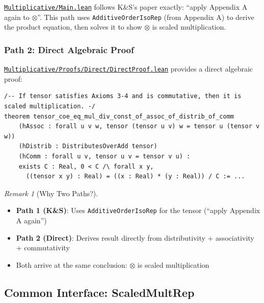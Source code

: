 \documentclass[11pt]{article}
\theoremstyle{definition}
\theoremstyle{remark}
\newtheorem{remark}[theorem]{Remark}
\begin{document}
\href{https://github.com/zariuq/ks-foundations-of-inference/blob/main/KnuthSkilling/Multiplicative/Main.lean}{\texttt{Multiplicative/Main.lean}} follows K\&S's paper exactly: ``apply Appendix A again to $\otimes$''.
This path uses \texttt{AdditiveOrderIsoRep} (from Appendix A) to derive the product equation,
then solves it to show $\otimes$ is scaled multiplication.

\subsubsection{Path 2: Direct Algebraic Proof}

\href{https://github.com/zariuq/ks-foundations-of-inference/blob/main/KnuthSkilling/Multiplicative/Proofs/Direct/DirectProof.lean}{\texttt{Multiplicative/Proofs/Direct/DirectProof.lean}} provides a direct algebraic proof:

\begin{lstlisting}[caption={Direct proof: Axioms 3--4 + commutativity $\Rightarrow$ scaled multiplication (\href{https://github.com/zariuq/ks-foundations-of-inference/blob/main/KnuthSkilling/Multiplicative/Proofs/Direct/DirectProof.lean\#L471}{DirectProof.lean:471})},numbers=none]
/-- If tensor satisfies Axioms 3-4 and is commutative, then it is scaled multiplication. -/
theorem tensor_coe_eq_mul_div_const_of_assoc_of_distrib_of_comm
    (hAssoc : forall u v w, tensor (tensor u v) w = tensor u (tensor v w))
    (hDistrib : DistributesOverAdd tensor)
    (hComm : forall u v, tensor u v = tensor v u) :
    exists C : Real, 0 < C /\ forall x y,
      ((tensor x y) : Real) = ((x : Real) * (y : Real)) / C := ...
\end{lstlisting}

\begin{remark}[Why Two Paths?]\leavevmode
\begin{itemize}
\item \textbf{Path 1 (K\&S)}: Uses \texttt{AdditiveOrderIsoRep} for the tensor (``apply Appendix A again'')
\item \textbf{Path 2 (Direct)}: Derives result directly from distributivity + associativity + commutativity
\item Both arrive at the same conclusion: $\otimes$ is scaled multiplication
\end{itemize}
\end{remark}

\subsection{Common Interface: ScaledMultRep}
\end{document}
